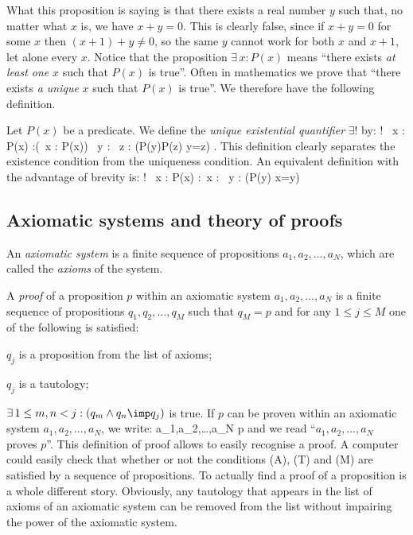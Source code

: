 What this proposition is saying is that there exists a real number $y$ such that, no matter what $x$ is, we have $x+y=0$.
This is clearly false, since if $x+y=0$ for some $x$ then $(x+1)+y\neq 0$, so the same $y$ cannot work for both $x$ and $x+1$, let alone every $x$.
\ee
Notice that the proposition $\exists \, x : P(x)$ means ``there exists \emph{at least one} $x$ such that $P(x)$ is true''. Often in mathematics we prove that ``there exists \emph{a unique} $x$ such that $P(x)$ is true''. We therefore have the following definition.

\bd
Let $P(x)$ be a predicate. We define the \emph{unique existential quantifier} $\exists !$ by:
\bse
\exists ! \, x : P(x) :\eqv (\exists \, x : P(x)) \land \forall \, y : \forall \, z : (P(y)\land P(z) \imp y=z) .
\ese
\ed
This definition clearly separates the existence condition from the uniqueness condition. An equivalent definition with the advantage of brevity is:
\bse
\exists ! \, x : P(x) :\eqv \exists \, x : \forall \, y : (P(y) \eqv x=y)
\ese

\subsection{Axiomatic systems and theory of proofs}

\bd
An \emph{axiomatic system} is a finite sequence of propositions $a_1,a_2,\ldots,a_N$, which are called the \emph{axioms} of the system.
\ed

\bd
A \emph{proof} of a proposition $p$ within an axiomatic system $a_1,a_2,\ldots,a_N$ is a finite sequence of propositions $q_1,q_2,\ldots,q_M$ such that $q_M=p$ and for any $1\leq j \leq M$ one of the following is satisfied:
\ben
\item[(A)] $q_j$ is a proposition from the list of axioms;
\item[(T)] $q_j$ is a tautology;
\item[(M)] $\exists \, 1\leq m,n <j : (q_m\land q_n \imp q_j)$ is true.
\een
\ed
\br
If $p$ can be proven within an axiomatic system $a_1,a_2,\ldots,a_N$, we write:
\bse
a_1,a_2,\ldots,a_N \vdash p
\ese
and we read ``$a_1,a_2,\ldots,a_N$ proves $p$''.
\er
\br
This definition of proof allows to easily recognise a proof.
A computer could easily check that whether or not the conditions (A), (T) and (M) are satisfied by a sequence of propositions.
To actually find a proof of a proposition is a whole different story.
\er
\br
Obviously, any tautology that appears in the list of axioms of an axiomatic system can be removed from the list without impairing the power of the axiomatic system.  
\er


